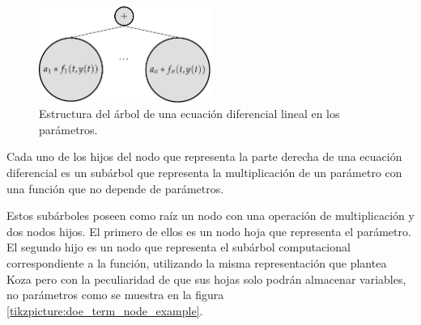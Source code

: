 


\begin{figure}[h]
    \centering
    \includegraphics[width=0.5\textwidth]{"figures/doe_node_example.pdf"}
    \caption{Estructura del árbol de una ecuación diferencial lineal en los parámetros.}
    \label{tikzpicture:doe_node_example}
\end{figure}

Cada uno de los hijos del nodo que representa la parte derecha de una ecuación diferencial es un subárbol que representa la multiplicación de un parámetro con una función que no depende de parámetros.

Estos subárboles poseen como raíz un nodo con una operación de multiplicación y dos nodos hijos. El primero de ellos es un nodo hoja que representa el parámetro. El segundo hijo es un nodo que representa el subárbol computacional correspondiente a la función, utilizando la misma representación que plantea Koza \cite{zelinka2005analytic} pero con la peculiaridad de que sus hojas solo podrán almacenar variables, no parámetros como se muestra en la figura \ref{tikzpicture:doe_term_node_example}.

